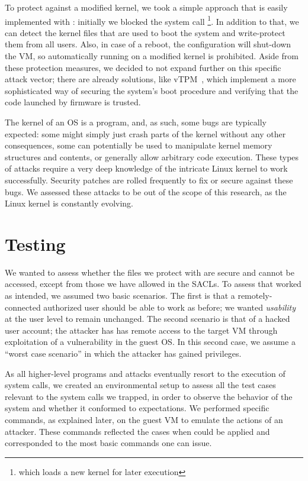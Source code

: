 \par To protect against a modified kernel, we took a simple approach that is easily implemented with : initially we blocked the system call \footnote{which loads a new kernel for later execution}. In addition to that, we can detect the kernel files that are used to boot the system and write-protect them from all users. Also, in case of a reboot, the configuration will shut-down the \ac{VM}, so automatically running on a modified kernel is prohibited. Aside from these protection measures, we decided to not expand further on this specific attack vector; there are already solutions, like vTPM~\cite{perez2006vtpm}, which implement a more sophisticated way of securing the system's boot procedure and verifying that the code launched by firmware is trusted. 

\par The kernel of an \ac{OS} is a program, and, as such, some bugs are typically expected: some might simply just crash parts of the kernel without any other consequences, some can potentially be used to manipulate kernel memory structures and contents, or generally allow arbitrary code execution. These types of attacks require a very deep knowledge of the intricate Linux kernel to work successfully. Security patches are rolled frequently to fix or secure against these bugs. We assessed these attacks to be out of the scope of this research, as the Linux kernel is constantly evolving. 

\section{Testing}\label{sec:testing}

\par We wanted to assess whether the files we protect with  are secure and cannot be accessed, except from those we have allowed in the \acp{SACL}. To assess that  worked as intended, we assumed two basic scenarios. The first is that a remotely-connected authorized user should be able to work as before; we wanted \emph{usability} at the user level to remain unchanged. The second scenario is that of a hacked user account; the attacker has has remote access to the target \ac{VM} through exploitation of a vulnerability in the guest \ac{OS}. In this second case, we assume a ``worst case scenario'' in which the attacker has gained  privileges. 

\par As all higher-level programs and attacks eventually resort to the execution of  system calls, we created an environmental setup to assess all the test cases relevant to the system calls we trapped, in order to observe the behavior of the system and whether it conformed to expectations. We performed specific commands, as explained later, on the guest \ac{VM} to emulate the actions of an attacker. These commands reflected the cases when  could be applied and corresponded to the most basic commands one can issue. 

